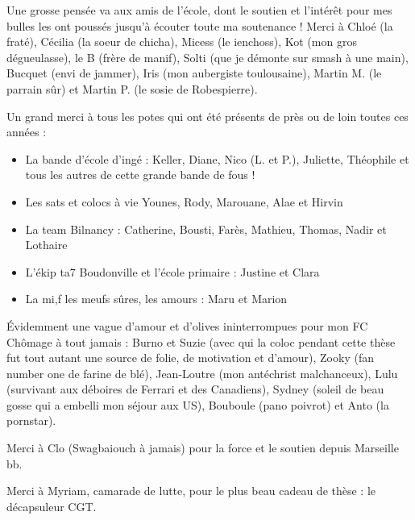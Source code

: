 \npar

Une grosse pensée va aux amis de l'école, dont le soutien et l'intérêt pour mes bulles les ont poussés jusqu'à écouter toute ma soutenance ! Merci à Chloé (la fraté), Cécilia (la soeur de chicha), Micess (le ienchoss), Kot (mon gros dégueulasse), le B (frère de manif),  Solti (que je démonte sur smash à une main), Bucquet (envi de jammer), Iris (mon aubergiste toulousaine), Martin M. (le parrain sûr) et Martin P. (le sosie de Robespierre).

\npar

Un grand merci à tous les potes qui ont été présents de près ou de loin toutes ces années : 

\begin{itemize}
\item La bande d'école d'ingé : Keller, Diane, Nico (L. et P.), Juliette, Théophile et tous les autres de cette grande bande de fous !

\item Les sats et colocs à vie Younes, Rody, Marouane, Alae et Hirvin

\item La team Bilnancy : Catherine, Bousti, Farès, Mathieu, Thomas, Nadir et Lothaire

\item L'ékip ta7 Boudonville et l'école primaire : Justine et Clara

\item La mi,f les meufs sûres, les amours : Maru et Marion

\end{itemize}

\npar

\'Evidemment une vague d'amour et d'olives ininterrompues pour mon FC Chômage à tout jamais : Burno et Suzie (avec qui la coloc pendant cette thèse fut tout autant une source de folie, de motivation et d'amour), Zooky (fan number one de farine de blé), Jean-Loutre (mon antéchrist malchanceux), Lulu (survivant aux déboires de Ferrari et des Canadiens), Sydney (soleil de beau gosse qui a embelli mon séjour aux US), Bouboule (pano poivrot) et Anto (la pornstar).

\npar

Merci à Clo (Swagbaiouch à jamais) pour la force et le soutien depuis Marseille bb. 

\npar

Merci à Myriam, camarade de lutte, pour le plus beau cadeau de thèse : le décapsuleur CGT.

\npar

